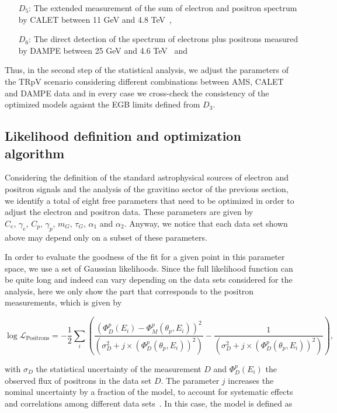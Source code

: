 \documentclass[a4paper,11pt]{article}
\begin{document}
\begin{itemize}
\item[$D_5$:] The extended measurement of the sum of electron and positron spectrum by CALET between 11 GeV and 4.8 TeV~\cite{Adriani:2018ktz},
\item[$D_6$:] The direct detection of the spectrum of electrons plus positrons measured by DAMPE between 25 GeV and 4.6 TeV~\cite{Ambrosi:2017wek} and
\end{itemize}
 
Thus, in the second step of the statistical analysis, we adjust the parameters of the TRpV scenario considering different combinations between AMS, CALET and DAMPE data and in every case we cross-check the consistency of the optimized models agaisnt the EGB limits defined from $D_3$. 
 
\subsection*{Likelihood definition and optimization algorithm} 
 
Considering the definition of the standard astrophysical sources of electron and positron signals and the analysis of the gravitino sector of the previous section, we identify a total of eight free parameters that need to be optimized in order to adjust the electron and positron data. These parameters are given by $C_e,\, \gamma_e,\,C_p,\,\gamma_p,\,m_G, \,\tau_G,\,\alpha_1$ and $\alpha_2$. Anyway, we notice that each data set shown above may depend only on a subset of these parameters. 

In order to evaluate the goodness of the fit for a given point in this parameter space, we use a set of Gaussian likelihoods. Since the full likelihood function can be quite long and indeed can vary depending on the data sets considered for the analysis, here we only show the part that corresponds to the positron measurements, which is given by

\begin{equation}
\log  \mathcal{L}_{\text{Positrons}} = -\frac{1}{2} \sum_i{\left( \frac{(\Phi_D^p(E_i) - \Phi_M^p(\theta_p,E_i ))^2}{(\sigma_D^2 + j\times (\Phi_D^{p}(\theta_p,E_i))^2)} - \frac{1}{(\sigma_D^2 + j\times (\Phi_D^{p}(\theta_p,E_i))^2)}  \right) },
\end{equation}

\noindent with $\sigma_D$ the statistical uncertainty of the measurement $D$ and $\Phi_D^p(E_i)$ the observed flux of positrons in the data set $D$. The parameter $j$ increases the nominal uncertainty by a fraction of the model, to account for systematic effects and correlations among different data sets~\cite{hogg2010data}. In this case, the model is defined as
\end{document}
